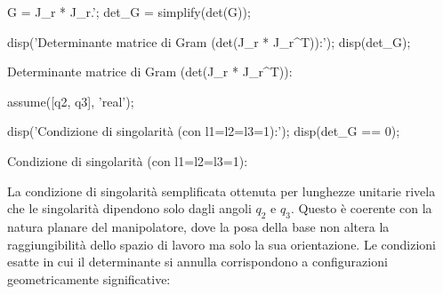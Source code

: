 \documentclass[11pt, a4paper]{article}
\begin{document}
\begin{matlabcode}
G = J_r * J_r.';
det_G = simplify(det(G));

disp('Determinante matrice di Gram (det(J_r * J_r^T)):');
disp(det_G);
\end{matlabcode}
\begin{matlaboutput}
Determinante matrice di Gram (det(J_r * J_r^T)):
\end{matlaboutput}
\begin{matlabcode}
assume([q2, q3], 'real');

disp('Condizione di singolarità (con l1=l2=l3=1):');
disp(det_G == 0);
\end{matlabcode}
\begin{matlaboutput}
Condizione di singolarità (con l1=l2=l3=1):
\end{matlaboutput}

\begin{par}
\begin{flushleft}
La condizione di singolarità semplificata ottenuta per lunghezze unitarie rivela che le singolarità dipendono solo dagli angoli $q_2$ e $q_3$. Questo è coerente con la natura planare del manipolatore, dove la posa della base non altera la raggiungibilità dello spazio di lavoro ma solo la sua orientazione. Le condizioni esatte in cui il determinante si annulla corrispondono a configurazioni geometricamente significative:
\end{flushleft}
\end{par}
\end{document}
